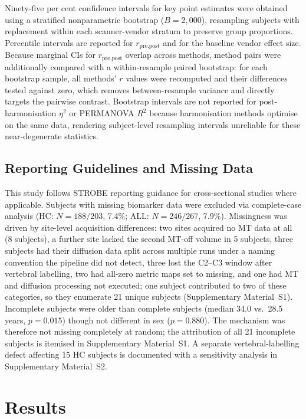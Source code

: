 \documentclass[12pt,a4paper]{article}
\begin{document}
Ninety-five per cent confidence intervals for key point estimates were obtained using a stratified nonparametric bootstrap ($B=2{,}000$), resampling subjects with replacement within each scanner-vendor stratum to preserve group proportions. Percentile intervals are reported for $r_{\text{pre,post}}$ and for the baseline vendor effect size. Because marginal CIs for $r_{\text{pre,post}}$ overlap across methods, method pairs were additionally compared with a within-resample paired bootstrap: for each bootstrap sample, all methods' $r$ values were recomputed and their differences tested against zero, which removes between-resample variance and directly targets the pairwise contrast. Bootstrap intervals are not reported for post-harmonisation $\eta^2$ or PERMANOVA $R^2$ because harmonisation methods optimise on the same data, rendering subject-level resampling intervals unreliable for these near-degenerate statistics.

\subsection{Reporting Guidelines and Missing Data}

This study follows STROBE reporting guidance for cross-sectional studies where applicable. Subjects with missing biomarker data were excluded via complete-case analysis (HC: $N=188/203$, 7.4\%; ALL: $N=246/267$, 7.9\%). Missingness was driven by site-level acquisition differences: two sites acquired no MT data at all (8 subjects), a further site lacked the second MT-off volume in 5 subjects, three subjects had their diffusion data split across multiple runs under a naming convention the pipeline did not detect, three lost the C2--C3 window after vertebral labelling, two had all-zero metric maps set to missing, and one had MT and diffusion processing not executed; one subject contributed to two of these categories, so they enumerate 21 unique subjects (Supplementary Material~S1). Incomplete subjects were older than complete subjects (median 34.0 vs.\ 28.5 years, $p=0.015$) though not different in sex ($p=0.880$). The mechanism was therefore not missing completely at random; the attribution of all 21 incomplete subjects is itemised in Supplementary Material~S1. A separate vertebral-labelling defect affecting 15 HC subjects is documented with a sensitivity analysis in Supplementary Material~S2.

\section{Results}
\end{document}
